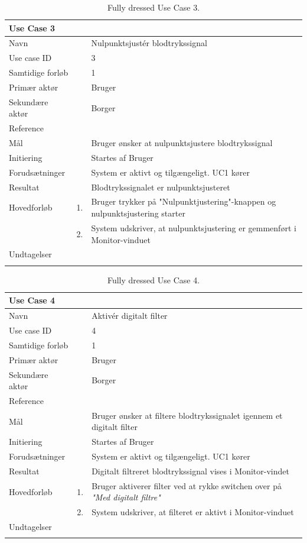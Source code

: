 \begin{longtabu} to  %
    {\large \textbf{Use Case 3}} && \\
    \toprule
    Navn &&    Nulpunktsjustér blodtrykssignal\\
    Use case ID &&    3\\
    Samtidige forløb &&    1\\
    Primær aktør &&    Bruger\\
    Sekundære aktør &&	Borger \\
    Reference &&      \\
    Mål &&    Bruger ønsker at nulpunktsjustere blodtrykssignal\\
    Initiering &&	Startes af Bruger\\
    Forudsætninger &&  System er aktivt og tilgængeligt. UC1 kører \\    Resultat &&		Blodtrykssignalet er nulpunktsjusteret\\ \midrule
    Hovedforløb &    1. &    Bruger trykker på "Nulpunktjustering"\--knappen og nulpunktsjustering starter\\[-1ex]   						 	
                &    2. &    System udskriver, at nulpunktsjustering er gemmenført i Monitor-vinduet\newline\\ \midrule
                
    Undtagelser &     &      \\ \bottomrule
\caption{Fully dressed Use Case 3.}
\label{UC3}
\end{longtabu}

\begin{longtabu} to  %
    {\large \textbf{Use Case 4}} && \\
    \toprule
    Navn &&    Aktivér digitalt filter\\
    Use case ID &&    4\\
    Samtidige forløb &&   1\\
    Primær aktør &&    Bruger\\
    Sekundære aktør &&	Borger \\
    Reference &&      \\
    Mål &&    Bruger ønsker at filtere blodtrykssignalet igennem et digitalt filter\\
    Initiering &&	Startes af Bruger\\
    Forudsætninger &&  System er aktivt og tilgængeligt. UC1 kører  \\
    Resultat &&		Digitalt filtreret blodtrykssignal vises i Monitor-vindet                 \\ \midrule
    Hovedforløb &    1. &    Bruger aktiverer filter ved at rykke switchen over på \textit{"Med digitalt filtre"} \\[-1ex]   						 	
                &    2. &    System udskriver, at filteret er aktivt i Monitor-vinduet\newline\\ \midrule
                
    Undtagelser &     &      \\ \bottomrule
\caption{Fully dressed Use Case 4.}
\label{UC4}
\end{longtabu}

